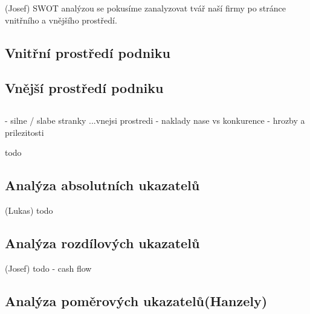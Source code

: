 \documentclass[12pt]{article}%
\begin{document}
 (Josef)
SWOT analýzou se pokusíme zanalyzovat tvář naší firmy po stránce vnitřního a vnějšího prostředí.


\subsection*{Vnitřní prostředí podniku}

\subsection*{Vnější prostředí podniku}

\subsection*{}

\subsection*{}

\subsection*{}

\subsection*{}

- silne / slabe stranky ...vnejsi prostredi
- naklady nase vs konkurence
- hrozby a prilezitosti

todo

\subsection{Analýza absolutních ukazatelů} (Lukas)
todo

\subsection{Analýza rozdílových ukazatelů} (Josef)
todo
- cash flow


\subsection{Analýza poměrových ukazatelů(Hanzely)}
\end{document}
